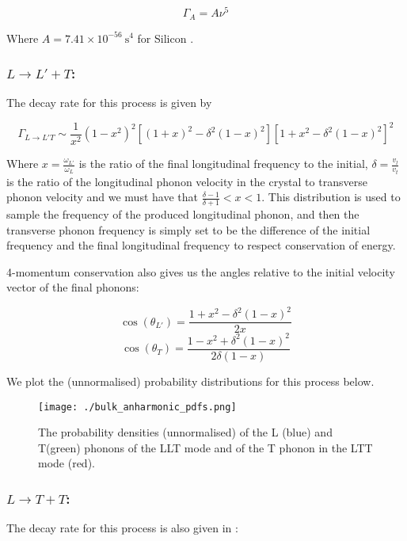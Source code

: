 \documentclass[11pt]{article}
\begin{document}
\begin{equation}
\Gamma_{A} = A\nu^5\label{eq:3}
\end{equation}

Where $A = 7.41 \times 10^{-56} \ \si{\second^4}$ for Silicon \cite{1}.

\subsubsection*{$L\rightarrow L'+T$:}
The decay rate for this process is given by \cite{3}

\begin{equation}
\Gamma_{L\rightarrow L'T} \sim \frac{1}{x^2}(1-x^2)^2\left[(1+x)^2 - \delta^2 (1-x)^2\right]\left[1 + x^2 - \delta^2(1-x)^2\right]^2
\end{equation}

Where $x = \frac{\omega_{L'}}{\omega_L}$ is the ratio of the final longitudinal frequency to the initial, $\delta = \frac{v_l}{v_t}$ is the ratio of
the longitudinal phonon velocity in the crystal to transverse phonon velocity and we must have that $\frac{\delta - 1}{\delta + 1} < x < 1$. This 
distribution is used to sample the frequency of the produced longitudinal phonon, and then the transverse phonon frequency is simply set to be
the difference of the initial frequency and the final longitudinal frequency to respect conservation of energy. 

4-momentum conservation also gives us the angles relative to the initial velocity vector of the final phonons:

\begin{equation}
\cos(\theta_{L'}) = \frac{1 + x^2 - \delta^2(1-x)^2}{2x} 
\end{equation}
\begin{equation}
\cos(\theta_T) = \frac{1 - x^2 + \delta^2(1-x)^2}{2\delta(1-x)}
\end{equation}

We plot the (unnormalised) probability distributions for this process below. 

\begin{figure}[!h]
\begin{center}
\texttt{[image: ./bulk\_anharmonic\_pdfs.png]}
\end{center}
\caption{The probability densities (unnormalised) of the L (blue) and T(green) phonons of the LLT mode and of the T phonon in the LTT mode (red).}
\end{figure}

\subsubsection*{$L\rightarrow T + T$:}
The decay rate for this process is also given in \cite{3}:
\end{document}
